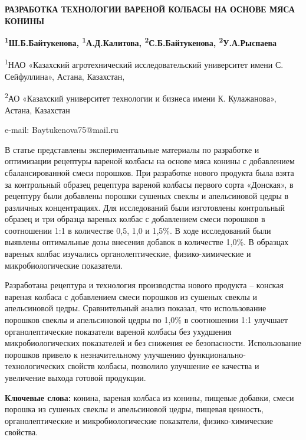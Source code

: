 \begin{articleheader}
{\bfseries РАЗРАБОТКА ТЕХНОЛОГИИ ВАРЕНОЙ КОЛБАСЫ НА ОСНОВЕ МЯСА КОНИНЫ}

{\bfseries
\textsuperscript{1}Ш.Б.Байтукенова\textsuperscript{\envelope },
\textsuperscript{1}А.Д.Калитова,
\textsuperscript{2}С.Б.Байтукенова,
\textsuperscript{2}У.А.Рыспаева
}
\end{articleheader}

\begin{affiliation}
\textsuperscript{1}НАО «Казахский агротехнический исследовательский
университет имени С. Сейфуллина», Астана, Казахстан,

\textsuperscript{2}АО «Казахский университет технологии и бизнеса имени
К. Кулажанова», Астана, Казахстан

e-mail: Baytukenova75@mail.ru
\end{affiliation}

В статье представлены экспериментальные материалы по разработке и
оптимизации рецептуры вареной колбасы на основе мяса конины с
добавлением сбалансированной смеси порошков. При разработке нового
продукта была взята за контрольный образец рецептура вареной колбасы
первого сорта «Донская», в рецептуру были добавлены порошки сушеных
свеклы и апельсиновой цедры в различных концентрациях. Для исследований
были изготовлены контрольный образец и три образца вареных колбас с
добавлением смеси порошков в соотношении 1:1 в количестве 0,5, 1,0 и
1,5\%. В ходе исследований были выявлены оптимальные дозы внесения
добавок в количестве 1,0\%. В образцах вареных колбас изучались
органолептические, физико-химические и микробиологические показатели.

Разработана рецептура и технология производства нового продукта --
конская вареная колбаса с добавлением смеси порошков из сушеных свеклы и
апельсиновой цедры. Сравнительный анализ показал, что использование
порошков свеклы и апельсиновой цедры по 1,0\% в соотношении 1:1 улучшает
органолептические показатели вареной колбасы без ухудшения
микробиологических показателей и без снижения ее безопасности.
Использование порошков привело к незначительному улучшению
функционально-технологических свойств колбасы, позволило улучшение ее
качества и увеличение выхода готовой продукции.

{\bfseries Ключевые слова:} конина, вареная колбаса из конины, пищевые
добавки, смеси порошка из сушеных свеклы и апельсиновой цедры, пищевая
ценность, органолептические и микробиологические показатели,
физико-химические свойства.

